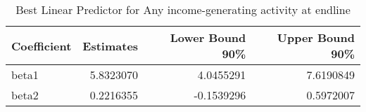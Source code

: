 \begin{table}

\caption{\label{tab:Qany_iga}Best Linear Predictor for Any income-generating activity at endline}
\centering
\begin{tabular}[t]{lrrr}
\toprule
Coefficient & Estimates & Lower Bound 90\% & Upper Bound 90\%\\
\midrule
beta1 & 5.8323070 & 4.0455291 & 7.6190849\\
beta2 & 0.2216355 & -0.1539296 & 0.5972007\\
\bottomrule
\end{tabular}
\end{table}
